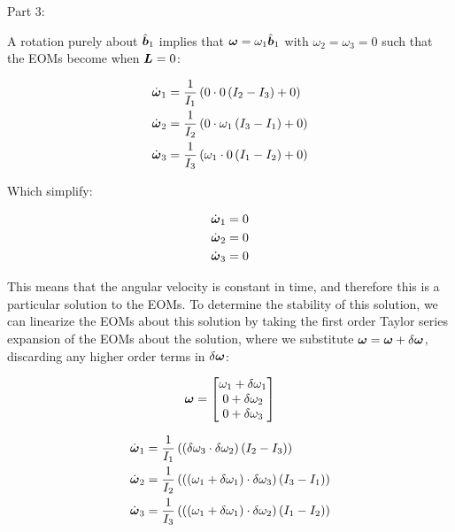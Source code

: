 Part 3:

A rotation purely about $\hat{\boldsymbol{b}}_1$ implies that $\boldsymbol{\omega} = \omega_1 \hat{\boldsymbol{b}}_1$ with $\omega_2=\omega_3 = 0$ such that the EOMs become when $\boldsymbol{L} = 0$:

\begin{align*}
    \dot{\boldsymbol{\omega}}_1 &= \frac{1}{I_1} \left(0 \cdot 0 \left(I_2 - I_3\right) + 0 \right)\\
    \dot{\boldsymbol{\omega}}_2 &= \frac{1}{I_2} \left(0 \cdot \omega_1 \left(I_3 - I_1\right) + 0 \right)\\
    \dot{\boldsymbol{\omega}}_3 &= \frac{1}{I_3} \left(\omega_1 \cdot 0 \left(I_1 - I_2\right) + 0 \right)\\
\end{align*}

Which simplify:

\begin{align*}
    \dot{\boldsymbol{\omega}}_1 &= 0\\
    \dot{\boldsymbol{\omega}}_2 &= 0\\
    \dot{\boldsymbol{\omega}}_3 &= 0\\
\end{align*}

This means that the angular velocity is constant in time, and therefore this is a particular solution to the EOMs. To determine the stability of this solution, we can linearize the EOMs about this solution by taking the first order Taylor series expansion of the EOMs about the solution, where we substitute $\boldsymbol{\omega} = \boldsymbol{\omega} + \delta\boldsymbol{\omega}$, discarding any higher order terms in $\delta\boldsymbol{\omega}$:

\begin{equation}
    \boldsymbol{\omega} = 
    \begin{bmatrix} \omega_1 + \delta\omega_1 \\ 0 + \delta\omega_2 \\ 0 + \delta\omega_3 \end{bmatrix}
\end{equation}

\begin{align*}
    \dot{\boldsymbol{\omega}}_1 &= \frac{1}{I_1} \left(\left(\delta\omega_3 \cdot  \delta\omega_2\right) \left(I_2 - I_3\right) \right)\\
    \dot{\boldsymbol{\omega}}_2 &= \frac{1}{I_2} \left(\left(\left(\omega_1 + \delta\omega_1\right) \cdot \delta\omega_3\right) \left(I_3 - I_1\right) \right)\\
    \dot{\boldsymbol{\omega}}_3 &= \frac{1}{I_3} \left(\left(\left(\omega_1 + \delta\omega_1\right) \cdot \delta\omega_2\right) \left(I_1 - I_2\right) \right)\\
\end{align*}

